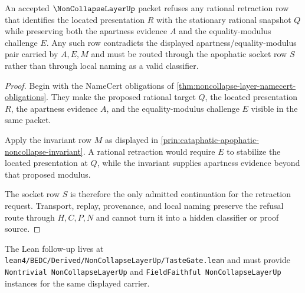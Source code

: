 \begin{theorem}
\label{thm:noncollapse-layer-rational-retraction-refusal}
An accepted $\NonCollapseLayerUp$ packet refuses any rational retraction row that identifies the located presentation $R$ with the stationary rational snapshot $Q$ while preserving both the apartness evidence $A$ and the equality-modulus challenge $E$. Any such row contradicts the displayed apartness/equality-modulus pair carried by $A,E,M$ and must be routed through the apophatic socket row $S$ rather than through local naming as a valid classifier.
\end{theorem}
\begin{proof}
Begin with the NameCert obligations of \autoref{thm:noncollapse-layer-namecert-obligations}. They make the proposed rational target $Q$, the located presentation $R$, the apartness evidence $A$, and the equality-modulus challenge $E$ visible in the same packet.

Apply the invariant row $M$ as displayed in \autoref{prin:cataphatic-apophatic-noncollapse-invariant}. A rational retraction would require $E$ to stabilize the located presentation at $Q$, while the invariant supplies apartness evidence beyond that proposed modulus.

The socket row $S$ is therefore the only admitted continuation for the retraction request. Transport, replay, provenance, and local naming preserve the refusal route through $H,C,P,N$ and cannot turn it into a hidden classifier or proof source.
\end{proof}



The Lean follow-up lives at \texttt{lean4/BEDC/Derived/NonCollapseLayerUp/TasteGate.lean} and must provide \texttt{Nontrivial NonCollapseLayerUp} and \texttt{FieldFaithful NonCollapseLayerUp} instances for the same displayed carrier.

